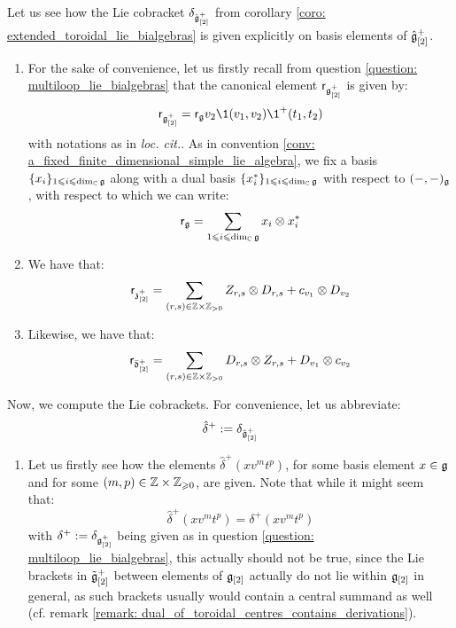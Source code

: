             \begin{remark} \label{remark: extended_toroidal_lie_bialgebras_explicit_formulae}
                Let us see how the Lie cobracket $\delta_{\hat{\mathfrak{g}}_{[2]}^+}$ from corollary \ref{coro: extended_toroidal_lie_bialgebras} is given explicitly on basis elements of $\hat{\mathfrak{g}}_{[2]}^+$.
                
                \begin{enumerate}
                    \item For the sake of convenience, let us firstly recall from question \ref{question: multiloop_lie_bialgebras} that the canonical element $\mathsf{r}_{\mathfrak{g}_{[2]}^+}$ is given by:
                        $$\sfr_{\g_{[2]}^+} = \sfr_{\g} v_2\1(v_1, v_2) \1^+(t_1, t_2)$$
                    with notations as in \textit{loc. cit.}. As in convention \ref{conv: a_fixed_finite_dimensional_simple_lie_algebra}, we fix a basis $\{x_i\}_{1 \leqslant i \leqslant \dim_{\mathbb{C}} \mathfrak{g}}$ along with a dual basis $\{x_i^*\}_{1 \leqslant i \leqslant \dim_{\mathbb{C}} \mathfrak{g}}$ with respect to $(-, -)_{\mathfrak{g}}$, with respect to which we can write:
                        $$\sfr_{\g} = \sum_{1 \leq i \leq \dim_{\bbC} \g} x_i \tensor x_i^*$$
                    \item We have that:
                        $$\sfr_{\z_{[2]}^+} = \sum_{(r, s) \in \Z \x \Z_{> 0}} Z_{r, s} \tensor D_{r, s} + c_{v_1} \tensor D_{v_2}$$
                    \item Likewise, we have that:
                        $$\sfr_{\bar{\d}_{[2]}^+} = \sum_{(r, s) \in \Z \x \Z_{> 0}} D_{r, s} \tensor Z_{r, s} + D_{v_1} \tensor c_{v_2}$$
                \end{enumerate}

                Now, we compute the Lie cobrackets. For convenience, let us abbreviate:
                    $$\hat{\delta}^+ := \delta_{\hat{\mathfrak{g}}_{[2]}^+}$$
                \begin{enumerate}
                    \item Let us firstly see how the elements $\hat{\delta}^+(x v^m t^p)$, for some basis element $x \in \mathfrak{g}$ and for some $(m, p) \in \Z \x \Z_{\geq 0}$, are given. Note that while it might seem that:
                        $$\hat{\delta}^+(x v^m t^p) = \delta^+(x v^m t^p)$$
                    with $\delta^+ := \delta_{\mathfrak{g}_{[2]}^+}$ being given as in question \ref{question: multiloop_lie_bialgebras}, this actually should not be true, since the Lie brackets in $\tilde{\mathfrak{g}}_{[2]}^+$ between elements of $\mathfrak{g}_{[2]}$ actually do not lie within $\mathfrak{g}_{[2]}$ in general, as such brackets usually would contain a central summand as well (cf. remark \ref{remark: dual_of_toroidal_centres_contains_derivations}).


\end{enumerate}
\end{remark}
